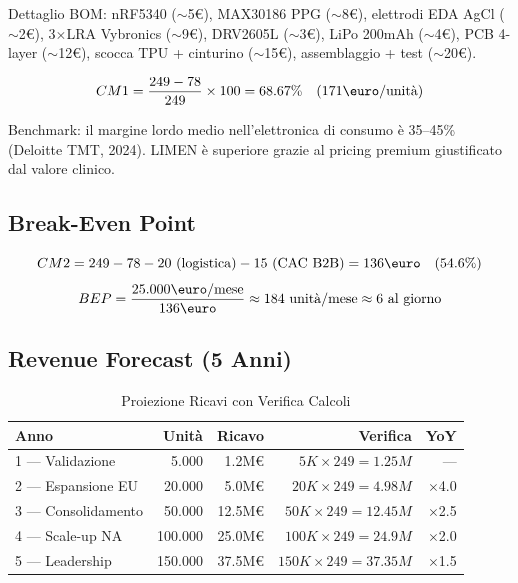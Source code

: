 \documentclass[12pt,a4paper]{article}
\begin{document}
Dettaglio BOM: nRF5340 ($\sim$5\euro), MAX30186 PPG ($\sim$8\euro), elettrodi EDA AgCl ($\sim$2\euro), 3$\times$LRA Vybronics ($\sim$9\euro), DRV2605L ($\sim$3\euro), LiPo 200mAh ($\sim$4\euro), PCB 4-layer ($\sim$12\euro), scocca TPU + cinturino ($\sim$15\euro), assemblaggio + test ($\sim$20\euro).

$$CM1 = \frac{249 - 78}{249} \times 100 = 68.67\% \quad \text{(171\euro/unità)}$$

Benchmark: il margine lordo medio nell'elettronica di consumo è 35--45\% (Deloitte TMT, 2024). LIMEN è superiore grazie al pricing premium giustificato dal valore clinico.

\subsection{Break-Even Point}
$$CM2 = 249 - 78 - 20\text{ (logistica)} - 15\text{ (CAC B2B)} = 136\text{\euro} \quad (54.6\%)$$
$$BEP = \frac{25.000\text{\euro/mese}}{136\text{\euro}} \approx 184 \text{ unità/mese} \approx 6 \text{ al giorno}$$

\subsection{Revenue Forecast (5 Anni)}
\begin{table}[h!]
    \centering
    \small
    \caption{Proiezione Ricavi con Verifica Calcoli}
    \vspace{0.3cm}
    \begin{tabularx}{\textwidth}{@{}l r r r r@{}}
        \toprule
        \textbf{Anno} & \textbf{Unità} & \textbf{Ricavo} & \textbf{Verifica} & \textbf{YoY} \\ \midrule
        1 --- Validazione & 5.000 & 1.2M\euro & $5K \times 249 = 1.25M$ & --- \\
        2 --- Espansione EU & 20.000 & 5.0M\euro & $20K \times 249 = 4.98M$ & $\times$4.0 \\
        3 --- Consolidamento & 50.000 & 12.5M\euro & $50K \times 249 = 12.45M$ & $\times$2.5 \\
        4 --- Scale-up NA & 100.000 & 25.0M\euro & $100K \times 249 = 24.9M$ & $\times$2.0 \\
        5 --- Leadership & 150.000 & 37.5M\euro & $150K \times 249 = 37.35M$ & $\times$1.5 \\
        \bottomrule
    \end{tabularx}
\end{table}
\end{document}
